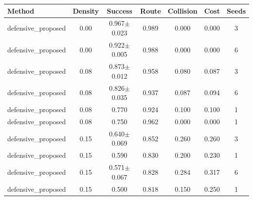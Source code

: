 \begin{tabular}{lcccccc}
\toprule
Method & Density & Success & Route & Collision & Cost & Seeds \\ 
\midrule
defensive_proposed & 0.00 & 0.967$\pm$0.023 & 0.989 & 0.000 & 0.000 & 3 \\ 
defensive_proposed & 0.00 & 0.922$\pm$0.005 & 0.988 & 0.000 & 0.000 & 6 \\ 
defensive_proposed & 0.08 & 0.873$\pm$0.012 & 0.958 & 0.080 & 0.087 & 3 \\ 
defensive_proposed & 0.08 & 0.826$\pm$0.035 & 0.937 & 0.087 & 0.094 & 6 \\ 
defensive_proposed & 0.08 & 0.770 & 0.924 & 0.100 & 0.100 & 1 \\ 
defensive_proposed & 0.08 & 0.750 & 0.962 & 0.000 & 0.000 & 1 \\ 
defensive_proposed & 0.15 & 0.640$\pm$0.069 & 0.852 & 0.260 & 0.260 & 3 \\ 
defensive_proposed & 0.15 & 0.590 & 0.830 & 0.200 & 0.230 & 1 \\ 
defensive_proposed & 0.15 & 0.571$\pm$0.067 & 0.828 & 0.284 & 0.317 & 6 \\ 
defensive_proposed & 0.15 & 0.500 & 0.818 & 0.150 & 0.250 & 1 \\ 
\bottomrule
\end{tabular}
